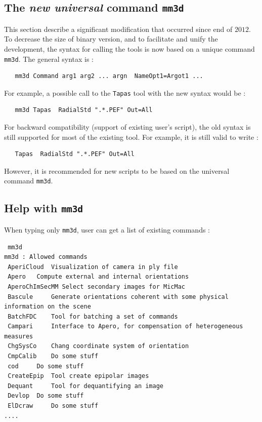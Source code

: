 


\subsection{The \emph{new universal} command {\tt mm3d}}

This section describe a significant modification that occurred since end of $2012$. To decrease the
size of binary version, and to facilitate and unify the development, the syntax for calling the tools is now
based on a unique command {\tt mm3d}. The general syntax is :

\begin{verbatim}
   mm3d Command arg1 arg2 ... argn  NameOpt1=Argot1 ...
\end{verbatim}

For example, a possible call to the {\tt Tapas} tool with the new syntax would be :

\begin{verbatim}
   mm3d Tapas  RadialStd ".*.PEF" Out=All
\end{verbatim}


For backward compatibility (support of existing user's script), the old syntax is still supported
for most of the existing tool. For example, it is still valid to write :

\begin{verbatim}
   Tapas  RadialStd ".*.PEF" Out=All
\end{verbatim}

However, it is recommended for new scripts to be based on the universal command {\tt mm3d}.



\subsection{Help with {\tt mm3d}}

When typing only {\tt mm3d}, user can get a list of existing commands :


\begin{verbatim}
 mm3d
mm3d : Allowed commands
 AperiCloud	 Visualization of camera in ply file
 Apero	 Compute external and internal orientations
 AperoChImSecMM	Select secondary images for MicMac
 Bascule	 Generate orientations coherent with some physical information on the scene
 BatchFDC	 Tool for batching a set of commands
 Campari	 Interface to Apero, for compensation of heterogeneous measures
 ChgSysCo	 Chang coordinate system of orientation
 CmpCalib	 Do some stuff
 cod	 Do some stuff
 CreateEpip	 Tool create epipolar images
 Dequant	 Tool for dequantifying an image
 Devlop	 Do some stuff
 ElDcraw	 Do some stuff
....
\end{verbatim}


